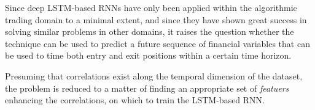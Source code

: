 Since deep LSTM-based RNNs have only been applied within the algorithmic trading domain to a minimal extent, and since they have shown great success in solving similar problems in other domains, it raises the question whether the technique can be used to predict a future sequence of financial variables that can be used to time both entry and exit positions within a certain time horizon.

Presuming that correlations exist along the temporal dimension of the dataset, the problem is reduced to a matter of finding an appropriate set of \textit{featuers} enhancing the correlations, on which to train the LSTM-based RNN.
